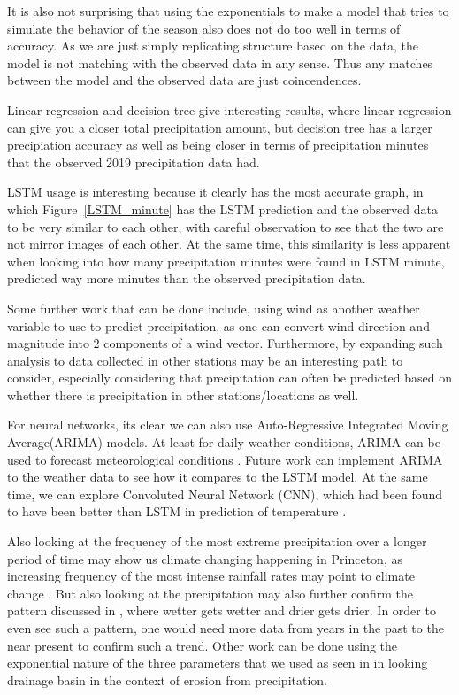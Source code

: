 \documentclass[11pt]{report}
\begin{document}
It is also not surprising that using the exponentials to make a model that tries to simulate the behavior of the season also does not do too well in terms of accuracy. As we are just simply replicating structure based on the data, the model is not matching with the observed data in any sense. Thus any matches between the model and the observed data are just coincendences. 

Linear regression and decision tree give interesting results, where linear regression can give you a closer total precipitation amount, but decision tree has a larger precipiation accuracy as well as being closer in terms of precipitation minutes that the observed 2019 precipitation data had. 

LSTM usage is interesting because it clearly has the most accurate graph, in which Figure~\ref{LSTM_minute} has the LSTM prediction and the observed data to be very similar to each other, with careful observation to see that the two are not mirror images of each other. At the same time, this similarity is less apparent when looking into how many precipitation minutes were found in LSTM minute, predicted way more minutes than the observed precipitation data. 

Some further work that can be done include, using wind as another weather
variable to use to predict precipitation, as one can convert wind
direction and magnitude into 2 components of a wind vector. Furthermore,
by expanding such analysis to data collected in other stations may be an
interesting path to consider, especially considering that precipitation
can often be predicted based on whether there is precipitation in other
stations/locations as well. 

For neural networks, its clear we can also use Auto-Regressive Integrated Moving Average(ARIMA) models. At least for daily weather conditions, ARIMA can be used to forecast meteorological conditions \cite[]{ARIMA}. Future work can implement ARIMA to the weather data to see how it compares to the LSTM model. At the same time, we can explore Convoluted Neural Network (CNN), which had been found to have been better than LSTM in prediction of temperature \cite[]{CNN}. 

Also looking at the frequency of the most extreme precipitation over a longer period of time may show us climate changing happening in Princeton, as  increasing frequency of the most intense rainfall rates may point to climate change . But also looking at the precipitation may also further confirm the pattern discussed in \cite{Held}, where wetter gets wetter and drier gets drier. In order to even see such a pattern, one would need more data from years in the past to the near present to confirm such a trend. Other work can be done using the exponential nature of the three parameters that we used as seen in \cite{Tucker} in looking drainage basin in the context of erosion from precipitation. 
\end{document}
